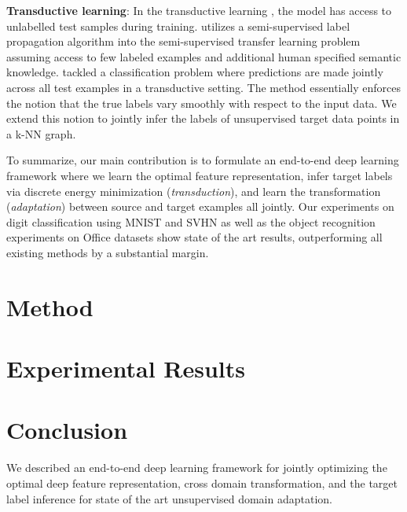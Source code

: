 \documentclass{article}
\begin{document}
\textbf{Transductive learning}: In the transductive learning \cite{transduction}, the model has access to unlabelled test samples during training.  \cite{marcus} utilizes a semi-supervised label propagation algorithm into the semi-supervised transfer learning problem assuming access to few labeled examples and additional human specified semantic knowledge. \cite{coclassification} tackled a classification problem where predictions are made jointly across all test examples in a transductive \cite{transduction} setting. The method essentially enforces the notion that the true labels vary smoothly with respect to the input data. We extend this notion to jointly infer the labels of unsupervised target data points in a k-NN graph. 

To summarize, our main contribution is to formulate an end-to-end deep learning framework where we learn the optimal feature representation, infer target labels via discrete energy minimization (\textit{transduction}), and learn the  transformation (\textit{adaptation}) between source and target examples all jointly. Our experiments on digit classification using MNIST \cite{mnist} and SVHN\cite{svhn} as well as the object recognition experiments on Office \cite{office} datasets show state of the art results, outperforming all existing methods by a substantial margin.


\section{Method} 




\section{Experimental Results}

\section{Conclusion} 
We described an end-to-end deep learning framework for jointly optimizing the optimal deep feature representation, cross domain transformation, and the target label inference for state of the art unsupervised domain adaptation.
\end{document}
